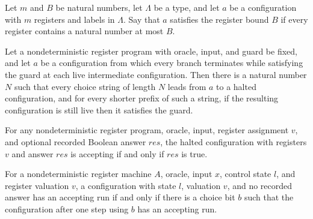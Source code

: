 \begin{definition}
\label{Complexity.LogProg.RegLe}
\leanok
{}
Let $m$ and $B$ be natural numbers, let $\Lambda$ be a type, and let $a$ be a
configuration with $m$ registers and labels in $\Lambda$. Say that $a$ satisfies the
register bound $B$ if every register contains a natural number at most $B$.
\end{definition}

\begin{theorem}
\label{Complexity.LogProg.NTerm.nhalts}
\leanok
{}
Let a nondeterministic register program with oracle, input, and guard be fixed, and let
$a$ be a configuration from which every branch terminates while satisfying the guard at
each live intermediate configuration. Then there is a natural number $N$ such that every
choice string of length $N$ leads from $a$ to a halted configuration, and for every
shorter prefix of such a string, if the resulting configuration is still live then it
satisfies the guard.
\end{theorem}

\begin{lemma}
\label{Complexity.LogProg.nacc_halted}
\leanok
{}
For any nondeterministic register program, oracle, input, register assignment $v$, and
optional recorded Boolean answer $res$, the halted configuration with registers $v$ and
answer $res$ is accepting if and only if $res$ is true.
\end{lemma}

\begin{lemma}
\label{Complexity.LogProg.nacc_live}
\leanok
{}
For a nondeterministic register machine $A$, oracle, input $x$, control state $l$, and
register valuation $v$, a configuration with state $l$, valuation $v$, and no recorded
answer has an accepting run if and only if there is a choice bit $b$ such that the
configuration after one step using $b$ has an accepting run.
\end{lemma}

